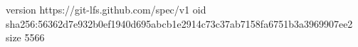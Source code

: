 version https://git-lfs.github.com/spec/v1
oid sha256:56362d7e932b0ef1940d695abcb1e2914c73c37ab7158fa6751b3a3969907ee2
size 5566
